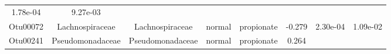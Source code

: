 \documentclass[11pt,]{article}
\begin{document}
\begin{longtable}[]{@{}cccccccc@{}}
\begin{minipage}[t]{0.08\columnwidth}
1.78e-04\strut
\end{minipage} & \begin{minipage}[t]{0.08\columnwidth}\centering\strut
9.27e-03\strut
\end{minipage}\tabularnewline
\begin{minipage}[t]{0.08\columnwidth}\centering\strut
Otu00072\strut
\end{minipage} & \begin{minipage}[t]{0.15\columnwidth}\centering\strut
Lachnospiraceae\strut
\end{minipage} & \begin{minipage}[t]{0.15\columnwidth}\centering\strut
Lachnospiraceae\strut
\end{minipage} & \begin{minipage}[t]{0.08\columnwidth}\centering\strut
normal\strut
\end{minipage} & \begin{minipage}[t]{0.09\columnwidth}\centering\strut
propionate\strut
\end{minipage} & \begin{minipage}[t]{0.07\columnwidth}\centering\strut
-0.279\strut
\end{minipage} & \begin{minipage}[t]{0.08\columnwidth}\centering\strut
2.30e-04\strut
\end{minipage} & \begin{minipage}[t]{0.08\columnwidth}\centering\strut
1.09e-02\strut
\end{minipage}\tabularnewline
\begin{minipage}[t]{0.08\columnwidth}\centering\strut
Otu00241\strut
\end{minipage} & \begin{minipage}[t]{0.15\columnwidth}\centering\strut
Pseudomonadaceae\strut
\end{minipage} & \begin{minipage}[t]{0.15\columnwidth}\centering\strut
Pseudomonadaceae\strut
\end{minipage} & \begin{minipage}[t]{0.08\columnwidth}\centering\strut
normal\strut
\end{minipage} & \begin{minipage}[t]{0.09\columnwidth}\centering\strut
propionate\strut
\end{minipage} & \begin{minipage}[t]{0.07\columnwidth}\centering\strut
0.264\strut
\end{minipage} & \begin{minipage}[t]{0.08\columnwidth}\centering\strut

\end{minipage}
\end{longtable}
\end{document}
